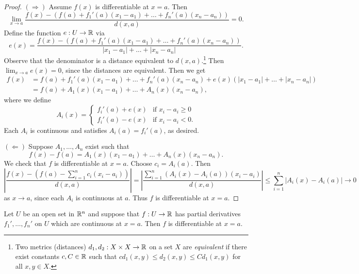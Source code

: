 \begin{proof}
  $(\Rightarrow)$ Assume $f(x)$ is differentiable
  at $x = a$. Then
  \[
    \lim_{x \to a} \frac{f(x) - (f(a) + f_1'(a)(x_1 - a_1) + \dots + f_n'(a)(x_n - a_n))}{d(x, a)} = 0.
  \]
  Define the function $e : U \to \mathbb{R}$ via
  \[
    e(x) = \frac{f(x) - (f(a) + f_1'(a)(x_1 - a_1) + \dots + f_n'(a)(x_n - a_n))}{|x_1 - a_1| + \dots + |x_n - a_n|}.
  \]
  Observe that the denominator is a distance
  equivalent to $d(x, a)$.\footnote{Two metrics (distances) $d_1, d_2 : X \times X \to \mathbb{R}$ on a set $X$ are \emph{equivalent} if there exist constants $c, C \in \mathbb{R}$ such that $cd_1(x, y) \le d_2(x, y) \le Cd_1(x, y)$ for all $x, y \in X$.} Then $\lim_{x \to a} e(x) = 0$, since
  the distances are equivalent. Then we get
  \begin{align*}
    f(x)
    &= f(a) + f_1'(a)(x_1 - a_1) + \dots + f_n'(a)(x_n - a_n) + e(x)(|x_1 - a_1| + \dots + |x_n - a_n|) \\
    &= f(a) + A_1(x)(x_1 - a_1) + \dots + A_n(x)(x_n - a_n),
  \end{align*}
  where we define
  \[
    A_i(x) =
    \begin{cases}
      f_i'(a) + e(x) & \text{if } x_i - a_i \ge 0 \\
      f_i'(a) - e(x) & \text{if } x_i - a_i < 0.
    \end{cases}
  \]
  Each $A_i$ is continuous and satisfies
  $A_i(a) = f_i'(a)$, as desired.

  $(\Leftarrow)$ Suppose $A_1, \dots, A_n$ exist
  such that
  \[
    f(x) - f(a) = A_1(x)(x_1 - a_1) + \dots + A_n(x)(x_n - a_n).
  \]
  We check that $f$ is differentiable at $x = a$.
  Choose $c_i = A_i(a)$. Then
  \[
    \left|\frac{f(x) - (f(a) - \sum_{i = 1}^n c_i (x_i - a_i))}{d(x, a)}\right|
    = \left|\frac{\sum_{i = 1}^n (A_i(x) - A_i(a))(x_i - a_i)}{d(x, a)}\right|
    \le \sum_{i = 1}^n |A_i(x) - A_i(a)| \to 0
  \]
  as $x \to a$, since each $A_i$ is continuous at $a$.
  Thus $f$ is differentiable at $x = a$.
\end{proof}

\begin{theorem}
  Let $U$ be an open set in $\mathbb{R}^n$ and suppose
  that $f : U \to \mathbb{R}$ has partial derivatives
  $f_1', \dots, f_n'$ on $U$ which are continuous
  at $x = a$. Then $f$ is differentiable at $x = a$.
\end{theorem}

